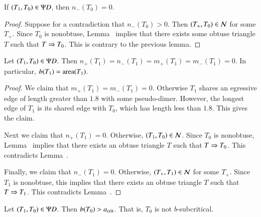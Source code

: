 \begin{corollary}
If $(T_1,T_0)\in\Psi D$, then $n_-(T_0)=0$.
\end{corollary}

\begin{proof} 
  Suppose for a contradiction that $n_-(T_0)>0$.  Then $(T_+,T_0)\in
  \mathcal N$ for some $T_+$.  Since $T_0$ is nonobtuse,
  Lemma~ implies that there exists some
  obtuse triangle $T$ such that $T\Rightarrow T_0$.  This is contrary to the
  previous lemma.
\end{proof}

\begin{lemma} 
  Let $(T_1,T_0)\in\Psi D$.  Then
  $n_+(T_1)=n_-(T_1)=m_+(T_1)=m_-(T_1)=0$.  In particular, $b(T_1) =
  {\operatorname{area}}(T_1)$.
\end{lemma}

\begin{proof}  
  We claim that $m_+(T_1)=m_-(T_1)=0$.  Otherwise $T_1$ shares an
  egressive edge of length greater than $1.8$ with some pseudo-dimer.
  However, the longest edge of $T_1$ is its shared edge with $T_0$,
  which has length less than $1.8$.  This gives the claim.

  Next we claim that $n_+(T_1)=0$.  Otherwise, $(T_1,T_0)\in \mathcal N$.
  Since $T_0$ is nonobtuse, Lemma~ 
  implies that there exists an obtuse
  triangle $T$ such that $T\Rightarrow T_0$.  This contradicts
  Lemma~.

  Finally, we claim that $n_-(T_1)=0$.  Otherwise, $(T_+,T_1)\in \mathcal N$ for
  some $T_+$.  Since $T_1$ is nonobtuse, this implies that there exists
  an obtuse triangle $T$ such that $T\Rightarrow T_1$.  This contradicts
  Lemma~.
\end{proof}

\begin{lemma}  
  Let $(T_1,T_0)\in\Psi D$.  Then $b(T_0) > a_\text{crit}$.  That is, $T_0$ is
  not $b$-subcritical.
\end{lemma}

